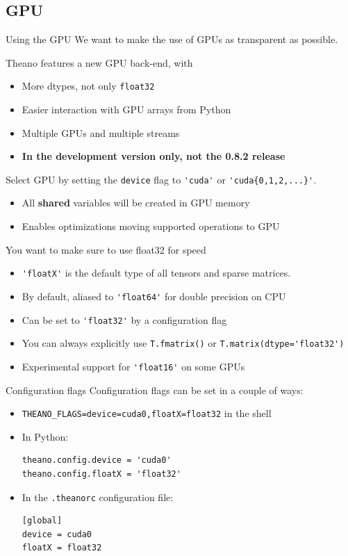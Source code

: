 \documentclass[a4paper,9pt]{beamer}
\begin{document}
\subsection{GPU}
\begin{frame}[fragile]{Using the GPU}
  We want to make the use of GPUs as transparent as possible.

  Theano features a new GPU back-end, with
  \begin{itemize}
    \item More dtypes, not only \verb|float32|
    \item Easier interaction with GPU arrays from Python
    \item Multiple GPUs and multiple streams
    \item \textbf{In the development version only, not the 0.8.2 release}
  \end{itemize}

  Select GPU by setting the \verb|device| flag to \verb|'cuda'| or \verb|'cuda{0,1,2,...}'|.
  \begin{itemize}
    \item All {\bf shared} variables will be created in GPU memory
    \item Enables optimizations moving supported operations to GPU
  \end{itemize}
  You want to make sure to use float32 for speed
  \begin{itemize}
    \item \verb|'floatX'| is the default type of all tensors and sparse matrices.
    \item By default, aliased to \verb|'float64'| for double precision on CPU
    \item Can be set to \verb|'float32'| by a configuration flag
    \item You can always explicitly use \verb|T.fmatrix()| or \verb|T.matrix(dtype='float32')|
    \item Experimental support for \verb|'float16'| on some GPUs
  \end{itemize}
\end{frame}

\begin{frame}[fragile]{Configuration flags}
  Configuration flags can be set in a couple of ways:
  \begin{itemize}
    \item \verb|THEANO_FLAGS=device=cuda0,floatX=float32| in the shell
    \item In Python:
      \begin{verbatim}
theano.config.device = 'cuda0'
theano.config.floatX = 'float32'
      \end{verbatim}
    \item In the \verb|.theanorc| configuration file:
      \begin{verbatim}
[global]
device = cuda0
floatX = float32
      \end{verbatim}
  \end{itemize}
\end{frame}
\end{document}
